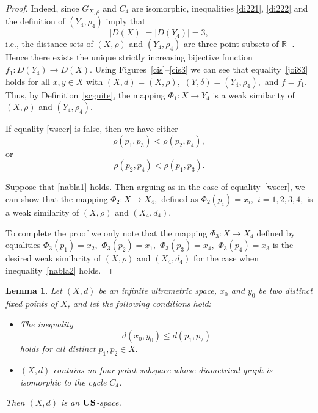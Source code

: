 \documentclass[11pt]{article}
\newtheorem{lemma}[theorem]{Lemma}
\theoremstyle{definition}
\theoremstyle{remark}
\numberwithin{equation}{section}
\begin{document}
\begin{proof}
Indeed, since $G_{X,\rho}$ and $C_4$ are isomorphic, inequalities \eqref{di221}, \eqref{di222} and the
definition of $(Y_4, \rho_4)$ imply that
\begin{equation*}
|D(X)| = |D(Y_4)| = 3,
\end{equation*}
i.e., the distance sets of $(X,\rho)$ and $(Y_4, \rho_4)$ are three-point subsets of $\mathbb{R}^+$.  
Hence there exists the unique strictly increasing bijective function $f_1 \colon D(Y_4) \to D(X).$
Using Figures~\ref{cis}--\ref{cis3} we can see that equality~\eqref{joi83} holds for all $x,y \in X$ with $(X,d) = (X,\rho),$  $(Y,\delta) = (Y_4, \rho_4),$
and $f = f_1$.  
Thus, by Definition~\ref{scguite}, the mapping $\Phi_1 \colon X \to Y_4$ is a weak similarity of $(X,\rho)$ and $(Y_4, \rho_4)$.





If equality \eqref{wseer} is false, then we have either
\begin{equation}
\label{nabla1}
\rho(p_1, p_3) < \rho(p_2, p_4), 
\end{equation}
or
\begin{equation}
    \label{nabla2}
\rho(p_2, p_4) < \rho(p_1, p_3).
\end{equation}

Suppose that \eqref{nabla1} holds. Then  arguing as in the case of equality~\eqref{wseer}, we can show that the mapping $\Phi_2 \colon X \to X_4,$ defined as  $\Phi_2(p_i) = x_i,$ $i=1,2,3,4,$
is a weak similarity of $(X,\rho)$ and $(X_4, d_4)$.


To complete the proof we only note that the mapping $
\Phi_3 \colon X \to X_4 $
defined by equalities $\Phi_3(p_1) = x_2,$ 
$\Phi_3(p_2) = x_1,$
$\Phi_3(p_3) = x_4,$ 
$\Phi_3(p_4) = x_3$
is the desired
weak similarity of $(X,\rho)$ and $(X_{4},d_{4})$ for the case when inequality~\eqref{nabla2} holds. 

\end{proof}







\begin{lemma}
    \label{fint}
    Let $(X,d)$ be an infinite ultrametric space, $x_0$ and $y_0$ be two distinct fixed points of $X$, and let the following conditions hold:

\begin{itemize}[left=10pt]
\item[(i)] The inequality
\begin{equation}\label{eq1}
d(x_0,y_0) \leq d(p_1,p_2) 
\end{equation}
 holds for all distinct $ p_1,p_2 \in X.$


\item[(ii)] $(X,d)$ contains no four-point subspace whose diametrical graph is isomorphic to the cycle $C_4$.
\end{itemize}

Then $(X,d)$ is an ${\bf US}$-space.

\end{lemma}
\end{document}
